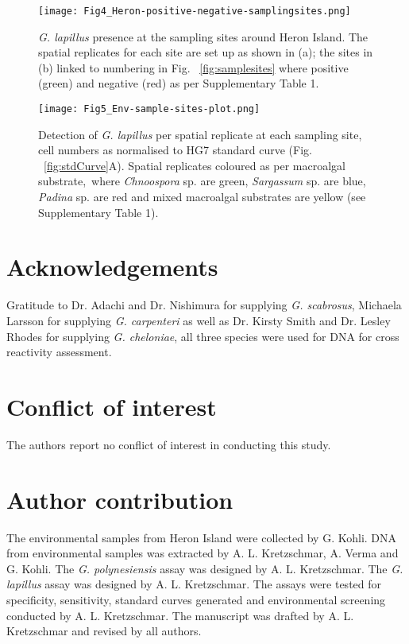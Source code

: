 \documentclass[12pt]{article}
\begin{document}
\FloatBarrier
\FloatBarrier 
\begin{figure} 
\texttt{[image: Fig4\_Heron-positive-negative-samplingsites.png]} 
\caption{\emph{G. lapillus} presence at the sampling sites around Heron Island. The spatial replicates for each site are set up as shown in (a); the sites in (b) linked to numbering in Fig. ~\ref{fig:samplesites} where positive (green) and negative (red) as per Supplementary Table 1.} 
\label{fig:envposneg}
\end{figure} 
\FloatBarrier

\begin{figure} 
\texttt{[image: Fig5\_Env-sample-sites-plot.png]} 
\caption{Detection of \emph{G. lapillus} per spatial replicate at each sampling site, cell numbers as normalised to HG7 standard curve (Fig. ~\ref{fig:stdCurve}A). Spatial replicates coloured as per macroalgal substrate,\ where \emph{Chnoospora} sp. are green, \emph{Sargassum} sp. are blue, \emph{Padina} sp. are red and mixed macroalgal substrates are yellow (see Supplementary Table 1).} 
\label{fig:envHG7}
\end{figure} 
\FloatBarrier
 \section*{Acknowledgements}
Gratitude to Dr. Adachi and Dr. Nishimura for supplying \emph{G. scabrosus}, Michaela Larsson for supplying \emph{G. carpenteri} as well as Dr. Kirsty Smith and Dr. Lesley Rhodes for supplying \emph{G. cheloniae}, all three species were used for DNA for cross reactivity assessment. 

\section*{Conflict of interest}
The authors report no conflict of interest in conducting this study.

\section*{Author contribution}
The environmental samples from Heron Island were collected by G. Kohli. DNA from environmental samples was extracted by A. L. Kretzschmar, A. Verma and G. Kohli. %
The \emph{G. polynesiensis} assay was designed by A. L. Kretzschmar. The \emph{G. lapillus} assay was designed by A. L. Kretzschmar. The assays were tested for specificity, sensitivity, standard curves generated and environmental screening conducted by A. L. Kretzschmar. The manuscript was drafted by A. L. Kretzschmar and revised by all authors.

\FloatBarrier
\newpage

%
%

\end{document}
